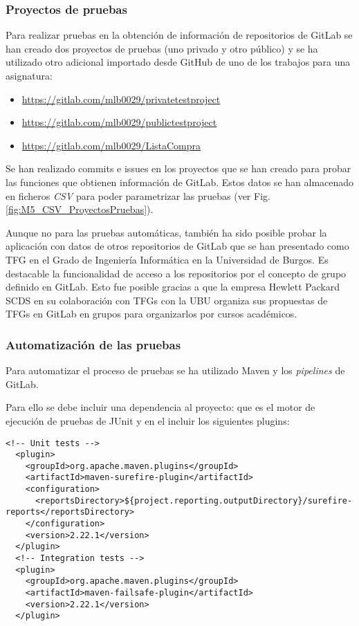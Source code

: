 \subsubsection{Proyectos de pruebas}

Para realizar pruebas en la obtención de información de repositorios de GitLab se han creado dos proyectos de pruebas (uno privado y otro público) y se ha utilizado otro adicional importado desde GitHub de uno de los trabajos para una asignatura:
\begin{itemize}
	\tightlist
	\item \url{https://gitlab.com/mlb0029/privatetestproject}
	\item \url{https://gitlab.com/mlb0029/publictestproject}
	\item \url{https://gitlab.com/mlb0029/ListaCompra}
\end{itemize}
Se han realizado commits e issues en los proyectos que se han creado para probar las funciones que obtienen información de GitLab. Estos datos se han almacenado en ficheros \textit{CSV} para poder parametrizar las pruebas (ver Fig. \ref{fig:M5_CSV_ProyectosPruebas}).


Aunque no para las pruebas automáticas, también ha sido posible probar la aplicación con datos de otros repositorios de GitLab que se han presentado como TFG en el Grado de Ingeniería Informática en la Universidad de Burgos. Es destacable la funcionalidad de acceso a los repositorios por el concepto de grupo definido en GitLab. Esto fue posible gracias a que la empresa Hewlett Packard SCDS en su colaboración con TFGs con la UBU organiza sus propuestas de TFGs en GitLab en grupos para organizarlos por cursos académicos.

\subsubsection{Automatización de las pruebas}

Para automatizar el proceso de pruebas se ha utilizado Maven y los \textit{pipelines} de GitLab.

Para ello se debe incluir una dependencia al proyecto:  que es el motor de ejecución de pruebas de JUnit y en el  incluir los siguientes plugins:\\
\begin{minipage}{\linewidth}
{\tiny
\begin{lstlisting}[breaklines]
  <!-- Unit tests -->
  <plugin>
	<groupId>org.apache.maven.plugins</groupId>
	<artifactId>maven-surefire-plugin</artifactId>
	<configuration>
	  <reportsDirectory>${project.reporting.outputDirectory}/surefire-reports</reportsDirectory>
	</configuration>
	<version>2.22.1</version>
  </plugin>
  <!-- Integration tests -->
  <plugin>
	<groupId>org.apache.maven.plugins</groupId>
	<artifactId>maven-failsafe-plugin</artifactId>
	<version>2.22.1</version>
  </plugin>	
\end{lstlisting}
}
\end{minipage}

